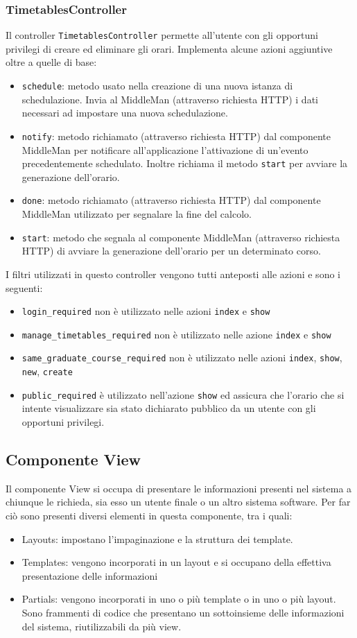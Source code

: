 \documentclass[11pt,a4paper]{article}
\begin{document}
\subsubsection{TimetablesController}
Il controller \verb|TimetablesController| permette all'utente con gli opportuni privilegi di creare ed eliminare gli orari.
Implementa alcune azioni aggiuntive oltre a quelle di base:
\begin{itemize}
\item \verb|schedule|: metodo usato nella creazione di una nuova istanza di schedulazione. Invia al MiddleMan (attraverso richiesta HTTP) i dati necessari ad impostare una nuova schedulazione.
\item \verb|notify|: metodo richiamato (attraverso richiesta HTTP) dal componente MiddleMan per notificare all'applicazione l'attivazione di un'evento precedentemente schedulato. Inoltre richiama il metodo \verb|start| per avviare la generazione dell'orario.
\item \verb|done|: metodo richiamato (attraverso richiesta HTTP) dal componente MiddleMan utilizzato per segnalare la fine del calcolo.
\item \verb|start|: metodo che segnala al componente MiddleMan (attraverso richiesta HTTP) di avviare la generazione dell'orario per un determinato corso.
\end{itemize}
I filtri utilizzati in questo controller vengono tutti anteposti alle azioni e sono i seguenti:
\begin{itemize}
 \item \verb|login_required| non è utilizzato nelle azioni \verb|index| e \verb|show|
 \item \verb|manage_timetables_required| non è utilizzato nelle azione \verb|index| e \verb|show|
 \item \verb|same_graduate_course_required| non è utilizzato nelle azioni \verb|index|, \verb|show|, \verb|new|, \verb|create|
 \item \verb|public_required| è utilizzato nell'azione \verb|show| ed assicura che l'orario che si intente visualizzare sia stato dichiarato pubblico da un utente con gli opportuni privilegi.
\end{itemize}
\subsection{Componente View}
Il componente View si occupa di presentare le informazioni presenti nel sistema a chiunque le richieda, sia esso un utente finale o un altro sistema software. Per far ciò sono presenti diversi elementi in questa componente, tra i quali:
\begin{itemize}
 \item Layouts: impostano l'impaginazione e la struttura dei template.
 \item Templates: vengono incorporati in un layout e si occupano della effettiva presentazione delle informazioni
 \item Partials: vengono incorporati in uno o più template o in uno o più layout. Sono frammenti di codice che presentano un sottoinsieme delle informazioni del sistema, riutilizzabili da più view.
\end{itemize}
\end{document}
